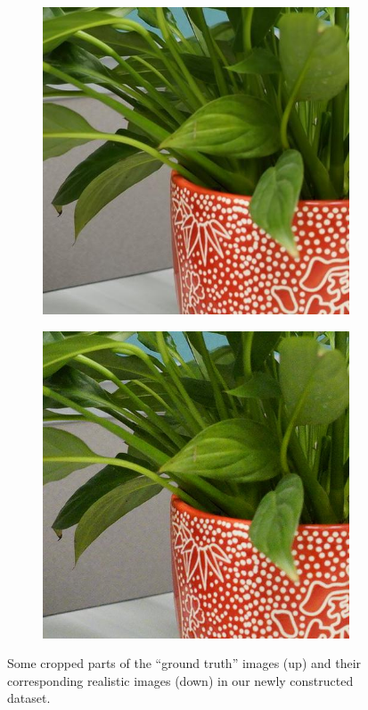 \begin{figure}
\begin{subfigure}[t]{0.24\textwidth}
    \end{subfigure}
    \hfill
    \begin{subfigure}[t]{0.24\textwidth}
        \centering
        \includegraphics[width=1\textwidth]{images/dataset/Sony_4-5_125_3200_plant_10_mean.JPG}
    \end{subfigure}
    \hfill
    \begin{subfigure}[t]{0.24\textwidth}
        \centering
        \includegraphics[width=1\textwidth]{images/dataset/Sony_4-5_125_3200_plant_10_real.JPG}
    \end{subfigure}

    \caption{Some cropped parts of the ``ground truth'' images (up) and their corresponding realistic images (down) in our newly constructed dataset.}
    \label{fig6-3}
\end{figure}
